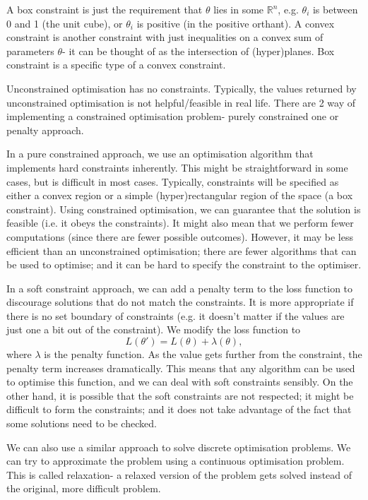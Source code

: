 \documentclass[a4paper, openany]{memoir}
\begin{document}
A box constraint is just the requirement that $\theta$ lies in some $\mathbb{R}^n$, e.g. $\theta_i$ is between 0 and 1 (the unit cube), or $\theta_i$ is positive (in the positive orthant). A convex constraint is another constraint with just inequalities on a convex sum of parameters $\theta$- it can be thought of as the intersection of (hyper)planes. Box constraint is a specific type of a convex constraint.

Unconstrained optimisation has no constraints. Typically, the values returned by unconstrained optimisation is not helpful/feasible in real life. There are 2 way of implementing a constrained optimisation problem- purely constrained one or penalty approach. 

In a pure constrained approach, we use an optimisation algorithm that implements hard constraints inherently. This might be straightforward in some cases, but is difficult in most cases. Typically, constraints will be specified as either a convex region or a simple (hyper)rectangular region of the space (a box constraint). Using constrained optimisation, we can guarantee that the solution is feasible (i.e. it obeys the constraints). It might also mean that we perform fewer computations (since there are fewer possible outcomes). However, it may be less efficient than an unconstrained optimisation; there are fewer algorithms that can be used to optimise; and it can be hard to specify the constraint to the optimiser.

In a soft constraint approach, we can add a penalty term to the loss function to discourage solutions that do not match the constraints. It is more appropriate if there is no set boundary of constraints (e.g. it doesn't matter if the values are just one a bit out of the constraint). We modify the loss function to
\[L(\theta') = L(\theta) + \lambda(\theta),\]
where $\lambda$ is the penalty function. As the value gets further from the constraint, the penalty term increases dramatically. This means that any algorithm can be used to optimise this function, and we can deal with soft constraints sensibly. On the other hand, it is possible that the soft constraints are not respected; it might be difficult to form the constraints; and it does not take advantage of the fact that some solutions need to be checked.

We can also use a similar approach to solve discrete optimisation problems. We can try to approximate the problem using a continuous optimisation problem. This is called relaxation- a relaxed version of the problem gets solved instead of the original, more difficult problem.
\end{document}
